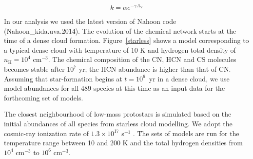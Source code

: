 \documentclass{aa}
\begin{document}
\begin{equation} \label{eq5} 
k = \alpha e^{-\gamma A_\mathrm{V}} 
\end{equation} 

In our analysis we used the latest version of Nahoon code (Nahoon\_kida.uva.2014). 
The evolution of the chemical network starts at the time of a dense cloud formation.
Figure~\ref{starless} shows a model corresponding to a typical dense cloud with temperature of 10 K
and hydrogen total density of $n_\mathrm{H} = 10^4$ cm$^{-3}$. The chemical composition
of the CN, HCN and CS molecules becomes stable after $10^{7}$ yr; the HCN abundance is higher
than that of CN. Assuming that star-formation begins at $t = 10^6$~yr in a dense cloud, we use model abundances for all 489 species at this time as an input data for the forthcoming set of models.

The closest neighbourhood of low-mass protostars is simulated based on the initial abundances of
all species from starless cloud modelling. We adopt the cosmic-ray ionization
rate of $1.3\times 10^{17}$ s$^{-1}$ \citep{Cra78}. The sets of models are run
for the temperature range between 10 and 200 K and the total hydrogen densities from $10^4$
cm$^{-3}$ to $10^6$ cm$^{-3}$. 
\end{document}
